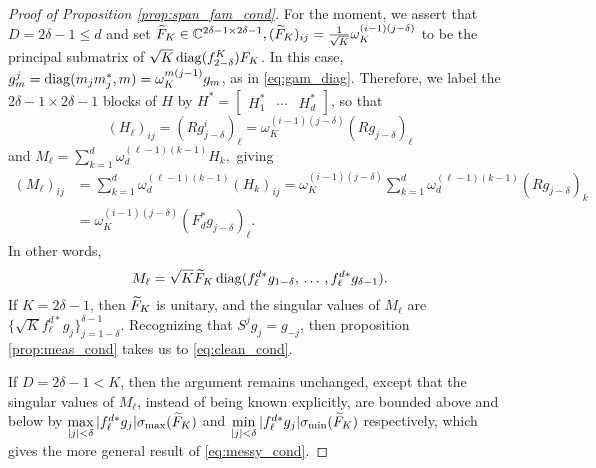 \begin{proof}[Proof of Proposition \ref{prop:span_fam_cond}]
  For the moment, we assert that $D = 2 \delta - 1 \le d$ and set $\widetilde{F}_K \in \mathbb{C}^{2 \delta - 1 \times 2 \delta - 1}, (\widetilde{F}_K)_{ij} = \frac{1}{\sqrt{K}}\omega_K^{(i-1)(j-\delta)}$ to be the principal submatrix of $\sqrt{K} \operatorname{diag}(f^K_{2 - \delta}) F_K$.  In this case, $g_m^j = \operatorname{diag}(m_j m_j^*, m) = \omega_K^{m(j - 1)} g_m$, as in \eqref{eq:gam_diag}.  Therefore, we label the $2 \delta - 1 \times 2 \delta - 1$ blocks of $H$ by $H^* = \begin{bmatrix} H_1^* & \cdots & H_d^* \end{bmatrix}$, so that \[(H_\ell)_{ij} = (R g_{j - \delta}^i)_\ell = \omega_K^{(i - 1)(j - \delta)}(R g_{j - \delta})_\ell\] and $M_\ell = \sum_{k = 1}^d \omega_d^{(\ell - 1)(k - 1)} H_k,$ giving \begin{align*} (M_\ell)_{ij} &= \sum_{k = 1}^d \omega_d^{(\ell - 1)(k - 1)} (H_k)_{ij} = \omega_K^{(i - 1)(j - \delta)} \sum_{k = 1}^d \omega_d^{(\ell - 1)(k - 1)} (Rg_{j - \delta})_k \\ &= \omega_K^{(i - 1)(j - \delta)} (F_d^* g_{j - \delta})_\ell. \end{align*}  In other words, \begin{equation} M_\ell = \sqrt{K} \widetilde{F}_K \operatorname{diag}(f_\ell^{d*} g_{1 - \delta},\, \ldots\, , f_\ell^{d*} g_{\delta - 1}). \label{eq:block_diag_components} \end{equation}  If $K = 2 \delta - 1$, then $\widetilde{F}_K$ is unitary, and the singular values of $M_\ell$ are $\{\sqrt{K} f_\ell^{d *} g_j\}_{j = 1 - \delta}^{\delta - 1}$.  Recognizing that $S^j g_j = g_{-j}$, then proposition \ref{prop:meas_cond} takes us to \eqref{eq:clean_cond}.

  If $D = 2 \delta - 1 < K$, then the argument remains unchanged, except that the singular values of $M_\ell$, instead of being known explicitly, are bounded above and below by $\max\limits_{|j| < \delta} |f_\ell^{d *} g_j| \sigma_{\max}(\widetilde{F}_K)$ and $\min\limits_{|j| < \delta} |f_\ell^{d *} g_j| \sigma_{\min}(\widetilde{F}_K)$ respectively, which gives the more general result of \eqref{eq:messy_cond}.


\end{proof}
